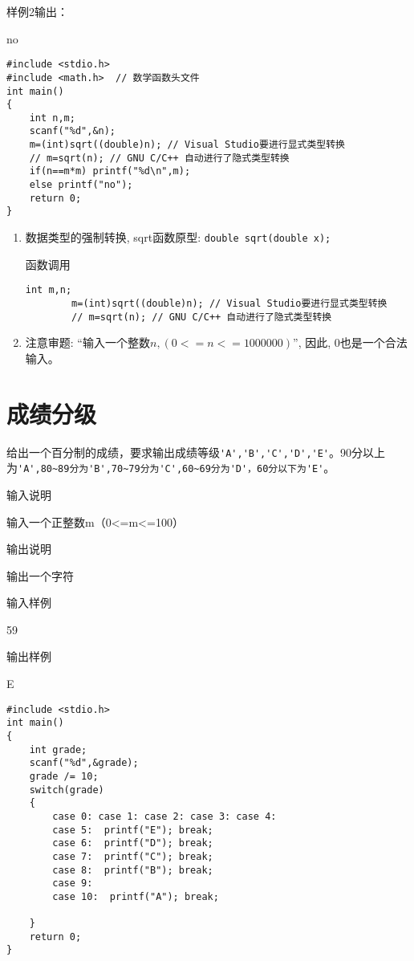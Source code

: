 样例2输出：

no

\begin{lstlisting}
#include <stdio.h>
#include <math.h>  // 数学函数头文件
int main()
{
	int n,m;
	scanf("%d",&n);
	m=(int)sqrt((double)n); // Visual Studio要进行显式类型转换
	// m=sqrt(n); // GNU C/C++ 自动进行了隐式类型转换
	if(n==m*m) printf("%d\n",m);
	else printf("no");
	return 0;
} 
\end{lstlisting}

\begin{note}[要点]
	\begin{enumerate}
	\item 数据类型的强制转换, sqrt函数原型: \lstinline|double sqrt(double x);|
	
	函数调用
	\begin{lstlisting}[frame=none]
		int m,n;
		m=(int)sqrt((double)n); // Visual Studio要进行显式类型转换
		// m=sqrt(n); // GNU C/C++ 自动进行了隐式类型转换
	\end{lstlisting}
	\item 注意审题: ``输入一个整数$n, (0<=n<=1000000)$'', 因此, 0也是一个合法输入。
\end{enumerate}
\end{note}

\section{成绩分级}	
给出一个百分制的成绩，要求输出成绩等级\lstinline|'A','B','C','D','E'|。90分以上为\lstinline|'A',80~89分为'B',70~79分为'C',60~69分为'D'，60分以下为'E'|。

输入说明	

输入一个正整数m（0<=m<=100）

输出说明
	
输出一个字符

输入样例
	
59

输出样例
	
E

\begin{lstlisting}
#include <stdio.h>
int main()
{
	int grade;
	scanf("%d",&grade);
	grade /= 10;
	switch(grade)
	{
		case 0: case 1: case 2: case 3: case 4: 
		case 5:  printf("E"); break;
		case 6:  printf("D"); break;
		case 7:  printf("C"); break;
		case 8:  printf("B"); break;
		case 9:
		case 10:  printf("A"); break;
		
	}
	return 0;
} 
\end{lstlisting}

